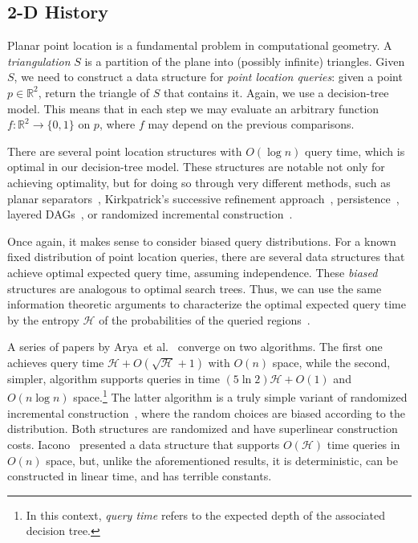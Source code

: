\documentclass[11pt]{article}
\newcommand{\etal}{et al.}
\begin{document}
\subsection{2-D History}

Planar point location is a fundamental problem in computational
geometry. A \emph{triangulation} $S$ is a partition of the plane into
(possibly infinite) triangles. Given $S$, 
we need to construct a data structure for \emph{point location queries}: 
given a point $p \in \mathbb{R}^2$, return the triangle of $S$ that contains it.
Again, we use a decision-tree model. This means that in each step we may
evaluate an arbitrary function 
$f: \mathbb{R}^2 \rightarrow \{0,1\}$  on $p$, where $f$ may depend on 
the previous comparisons.

There are several point location structures with $O(\log n)$ query time, which
is optimal in our decision-tree model.
These structures are notable not only for achieving optimality,
but for doing so through very different methods,
such as planar separators~\cite{LiptonTa80,LiptonTa79}, Kirkpatrick's 
successive refinement approach~\cite{kirk}, persistence~\cite{ppl5},
layered DAGs~\cite{EdelsbrunnerGuSt86},
or randomized incremental construction~\cite{trapseidel,Mulmuley90}.

Once again, it makes sense to consider biased
query distributions.
For a known fixed distribution of point location queries, there are
several data structures that achieve optimal expected query time,
assuming independence. 
These \emph{biased} structures are
analogous to optimal search trees. Thus, we can use the same information
theoretic arguments to characterize the optimal expected query time
by the entropy $\mathcal{H}$ of the probabilities of the 
queried regions~\cite[Claim~2.2]{AilonChClLiMuSe11}.
 
A series of papers by 
Arya~\etal~\cite{AryaMaMo07,AryaMaMoWo07,
AryaMaMo01,AryaMaMo01a,AryaMaMo00,AryaChMoHa00}
converge on two algorithms. The first one achieves query time 
$\mathcal{H}+O(\sqrt{\mathcal{H}}+1)$ with
$O(n)$ space, while the second, simpler, algorithm supports queries in time $(5 \ln
2)\mathcal{H}+O(1)$ and $O(n \log n)$ space.\footnote{In this context,
\emph{query time} refers to the expected depth of the associated
decision tree.} The latter algorithm is a 
truly simple variant of randomized incremental 
construction~\cite{trapseidel,Mulmuley90}, where the 
random choices are biased according to the distribution. Both structures 
are randomized and have superlinear construction costs. 
Iacono~\cite{Iacono04} presented a data structure 
that supports
$O(\mathcal{H})$ time queries in $O(n)$ space, but, 
unlike the aforementioned results, it is
deterministic, can be constructed in linear time, and has terrible constants.
\end{document}
